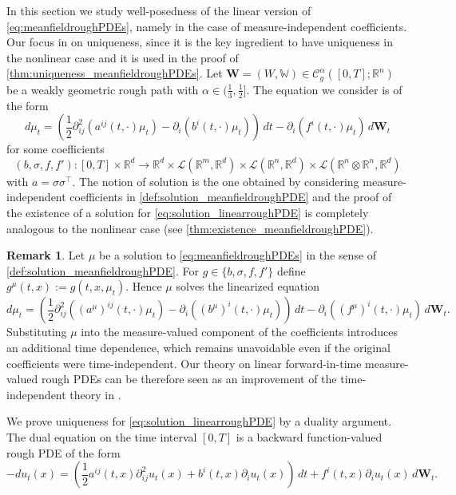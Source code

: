 \documentclass[10pt, a4paper]{article} %
\newcommand{\R}{\mathbb{R}}
\theoremstyle{definition}
\newtheorem{rmk}[defn]{Remark}
\theoremstyle{plain}
\begin{document}
In this section we study well-posedness of the linear version of \eqref{eq:meanfieldroughPDEs}, namely in the case of measure-independent coefficients.
Our focus in on uniqueness, since it is the key ingredient to have uniqueness in the nonlinear case and it is used in the proof of \cref{thm:uniqueness_meanfieldroughPDEs}. 
Let $\mathbf{W}=(W,\mathbb{W}) \in \mathscr{C}_g^\alpha([0,T];\R^n)$ be a weakly geometric rough path with $\alpha \in (\frac{1}{3}, \frac{1}{2}]$. 
The equation we consider is of the form \begin{equation} \label{eq:solution_linearroughPDE}
    d\mu_t = \left(\frac{1}{2} \partial^2_{ij} (a^{ij}(t,\cdot) \mu_t) - \partial_i (b^i(t,\cdot) \mu_t) \right) \, dt - \partial_i (f^i(t,\cdot) \mu_t ) \, d\mathbf{W}_t
\end{equation} 
for some coefficients \begin{equation*}
    (b,\sigma,f,f'): [0,T] \times \R^d \to \R^d \times \mathscr{L}(\R^m,\R^d) \times \mathscr{L}(\R^n,\R^d) \times \mathscr{L}(\R^n \otimes \R^n,\R^d)
\end{equation*}
with $a = \sigma \sigma^\top$. 
The notion of solution is the one obtained by considering measure-independent coefficients in \cref{def:solution_meanfieldroughPDE} and the proof of the existence of a solution for \eqref{eq:solution_linearroughPDE} is completely analogous to the nonlinear case (see \cref{thm:existence_meanfieldroughPDE}). 

\begin{rmk}
    Let $\mu$ be a solution to \eqref{eq:meanfieldroughPDEs} in the sense of \cref{def:solution_meanfieldroughPDE}. 
    For $g \in \{b,\sigma,f,f'\}$ define $g^\mu(t,x) := g(t,x,\mu_t)$. 
    Hence $\mu$ solves the linearized equation 
    $$d\mu_t = \left(\frac{1}{2} \partial^2_{ij} ((a^\mu)^{ij}(t,\cdot) \mu_t) -\partial_i ((b^\mu)^i(t,\cdot)\mu_t) \right) \, dt -  \partial_i ((f^\mu)^i(t,\cdot) \mu_t) \, d\mathbf{W}_t.$$
    Substituting $\mu$ into the measure-valued component of the coefficients introduces an additional time dependence, which remains unavoidable even if the original coefficients were time-independent.
    Our theory on linear forward-in-time measure-valued rough PDEs can be therefore seen as an improvement of the time-independent theory in \cite{DFS17}. 
\end{rmk} 
 
We prove uniqueness for \eqref{eq:solution_linearroughPDE} by a duality argument. 
The dual equation on the time interval $[0,T]$ is a backward function-valued rough PDE of the form \begin{equation} \label{eq:backwardlinearroughPDE}
        - du_t(x) = \left( \frac{1}{2}  a^{ij}(t,x) \partial^2_{ij} u_t(x)  + b^i(t,x) \partial_i u_t(x) \right) \, dt + f^i(t,x) \partial_i u_t(x) \, d\mathbf{W}_t .
\end{equation}  
\end{document}
